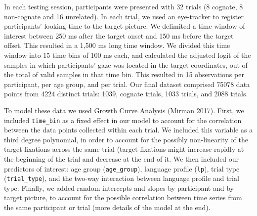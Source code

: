 \documentclass[
]{article}
\newenvironment{Shaded}{\begin{snugshade}}{\end{snugshade}}
\newcommand{\AttributeTok}[1]{\textcolor[rgb]{0.77,0.63,0.00}{#1}}
\newcommand{\FunctionTok}[1]{\textcolor[rgb]{0.00,0.00,0.00}{#1}}
\newcommand{\NormalTok}[1]{#1}
\newcommand{\OtherTok}[1]{\textcolor[rgb]{0.56,0.35,0.01}{#1}}
\newcommand{\SpecialCharTok}[1]{\textcolor[rgb]{0.00,0.00,0.00}{#1}}
\begin{document}
\begin{Shaded}
\end{Shaded}

In each testing session, participants were presented with 32 trials (8
cognate, 8 non-cognate and 16 unrelated). In each trial, we used an
eye-tracker to register participants' looking time to the target
picture. We delimited a time window of interest between 250 ms after the
target onset and 150 ms before the target offset. This resulted in a
1,500 ms long time window. We divided this time window into 15 time bins
of 100 ms each, and calculated the adjusted logit of the samples in
which participants' gaze was located in the target coordinates, out of
the total of valid samples in that time bin. This resulted in 15
observations per participant, per age group, and per trial. Our final
dataset comprised 75078 data points from 4224 distinct trials: 1039,
cognate trials, 1033 trials, and 2088 trials.

To model these data we used Growth Curve Analysis (Mirman 2017). First,
we included \texttt{time\_bin} as a fixed effect in our model to account
for the correlation between the data points collected within each trial.
We included this variable as a third degree polynomial, in order to
account for the possibly non-linearity of the target fixations across
the same trial (target fixations might increase rapidly at the beginning
of the trial and decrease at the end of it. We then included our
predictors of interest: age group (\texttt{age\_group}), language
profile (\texttt{lp}), trial type (\texttt{trial\_type}), and the
two-way interaction between language profile and trial type. Finally, we
added random intercepts and slopes by participant and by target picture,
to account for the possible correlation between time series from the
same participant or trial (more details of the model at the end).
\end{document}
